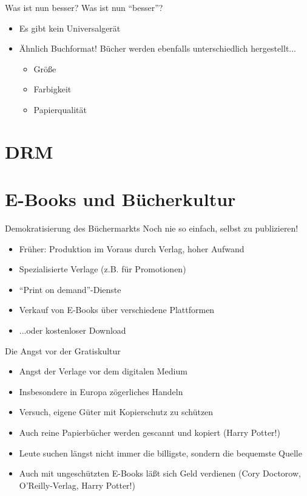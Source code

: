 \documentclass[hyperref={pdfpagelabels=false}]{beamer}
\begin{document}
\begin{frame}{Was ist nun besser?}
	Was ist nun "`besser"'?
\begin{itemize}
		\item Es gibt kein Universalgerät
		\item Ähnlich Buchformat! Bücher werden ebenfalls unterschiedlich hergestellt...
		\begin{itemize}
			\item Größe
			\item Farbigkeit
			\item Papierqualität
		\end{itemize}
	\end{itemize}
\end{frame}


\section{DRM}




\section{E-Books und Bücherkultur}

\begin{frame}{Demokratisierung des Büchermarkts}
	Noch nie so einfach, selbst zu publizieren!
	\begin{itemize}
		\item Früher: Produktion im Voraus durch Verlag, hoher Aufwand
		\item<2-> Spezialisierte Verlage (z.B. für Promotionen)
		\item<3-> "`Print on demand"'-Dienste
		\item<4-> Verkauf von E-Books über verschiedene Plattformen
		\item<4-> ...oder kostenloser Download
	\end{itemize}
\end{frame}


\begin{frame}{Die Angst vor der Gratiskultur}
	\begin{itemize}
		\item Angst der Verlage vor dem digitalen Medium
		\item Insbesondere in Europa zögerliches Handeln
		\item Versuch, eigene Güter mit Kopierschutz zu schützen
		\item<2-> Auch reine Papierbücher werden gescannt und kopiert (Harry Potter!)
		\item<2-> Leute suchen längst nicht immer die billigste, sondern die bequemste Quelle
		\item<3-> Auch mit ungeschützten E-Books läßt sich Geld verdienen (Cory Doctorow, O'Reilly-Verlag, Harry Potter!)
	\end{itemize}
\end{frame}
\end{document}
